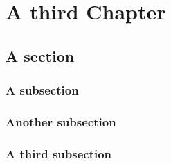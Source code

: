 
\chapter{A third Chapter}
\label{Chapter:3}

\section{A section}

\subsection{A subsection}
\lipsum[4]


\subsection{Another subsection}
\lipsum[5]


\subsection{A third subsection}
\lipsum[6]